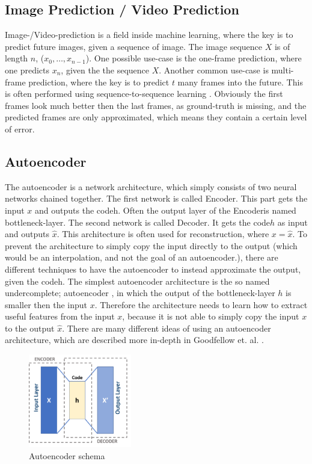  \subsection{Image Prediction / Video Prediction} \label{subsection::imageprediction}
  Image-/Video-prediction is a field inside machine learning, where the key is to predict future images, given a sequence of image. The image sequence $X$ is of length $n$, ($x_0, \ldots, x_{n-1}$).
  One possible use-case is the one-frame prediction, where one predicts $x_n$, given the the sequence $X$. Another common use-case is multi-frame prediction, where the key is to predict $t$ many
  frames into the future. This is often performed using sequence-to-sequence learning \cite{Sutskever2014}. Obviously the first frames look much better then the last frames, as ground-truth is 
  missing, and the predicted frames are only approximated, which means they contain a certain level of error.

 \subsection{Autoencoder} \label{subsection::autoencoder}
  The autoencoder is a network architecture, which simply consists of two neural networks chained together. The first network is called \glqq Encoder\grqq. This part gets the input $x$ and outputs
  the \glqq code\grqq h. Often the output layer of the \glqq Encoder\grqq is named bottleneck-layer. The second network is called \glqq Decoder\grqq. It gets the \glqq code\grqq $h$ as input
  and outputs $\hat{x}$. This architecture is often used for reconstruction, where $x = \hat{x}$. To prevent the architecture to simply copy the input directly to the output (which would be an
  interpolation, and not the goal of an autoencoder.), there are different techniques to have the autoencoder to instead approximate the output, given the \glqq code\grqq h.
  The simplest autoencoder architecture is the so named \glqq undercomplete\grqq; autoencoder \cite{Goodfellow2016}, in which the output of the bottleneck-layer $h$ is smaller then the input $x$.
  Therefore the architecture needs to learn how to extract useful features from the input $x$, because it is not able to simply copy the input $x$ to the output $\hat{x}$. There are many different
  ideas of using an autoencoder architecture, which are described more in-depth in Goodfellow et. al. \cite{Goodfellow2016}.
  \begin{figure}[H]
   \includegraphics[width=0.4\textwidth]{../Images/autoencoder_schema.png}
   \centering
   \caption{Autoencoder schema \citep{wiki2019}}
   \label{fig:lstm_architecture}
  \end{figure}

